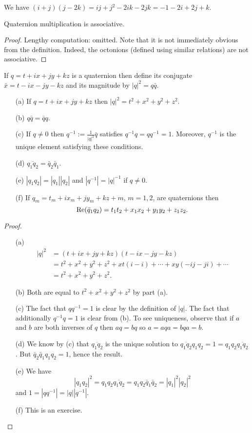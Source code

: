 \documentclass[12pt]{article}
\begin{document}
\begin{exm}
We have $(i+j)(j-2k)=ij+j^2-2ik-2jk=-1-2i+2j+k$.
\end{exm}

\begin{lma}
Quaternion multiplication is associative.
\end{lma}
\begin{proof}
Lengthy computation: omitted. Note that it is not immediately obvious from the definition. Indeed, the octonions (defined using similar relations) are not associative.
\end{proof}

\begin{dfn}
If $q=t+ix+jy+kz$ is a quaternion then define its conjugate $\bar{x}=t-ix-jy-kz$ and its magnitude by $|q|^2=q\bar{q}$.
\end{dfn}

\begin{lma}
  \begin{enumerate}
  \item[(a)] If $q=t+ix+jy+kz$ then $|q|^2=t^2+x^2+y^2+z^2$.
  \item[(b)] $q\bar{q}=\bar{q}q$.
  \item[(c)] If $q\neq 0$ then $q^{-1}:=\frac{1}{|q|^2}\bar{q}$ satisfies $q^{-1}q=qq^{-1}=1$. Moreover, $q^{-1}$ is the unique element satisfying these conditions.
  \item[(d)] $\overline{q_1q_2}=\bar{q}_2\bar{q}_1$.
  \item[(e)] $|q_1q_2|=|q_1||q_2|$ and $|q^{-1}|=|q|^{-1}$ if $q\neq 0$.
  \item[(f)] If $q_m=t_m+ix_m+jy_m+kz+m$, $m=1,2$, are quaternions then
    \[\operatorname{Re}(\bar{q}_1q_2)=t_1t_2+x_1x_2+y_1y_2+z_1z_2.\]
  \end{enumerate}
\end{lma}
\begin{proof}
  \begin{enumerate}
    \item[(a)] \begin{align*}
  |q|^2&=(t+ix+jy+kz)(t-ix-jy-kz)\\
  &=t^2+x^2+y^2+z^2+xt(i-i)+\cdots+xy(-ij-ji)+\cdots\\
  &=t^2+x^2+y^2+z^2.
    \end{align*}
    \item[(b)] Both are equal to $t^2+x^2+y^2+z^2$ by part (a).
    \item[(c)] The fact that $qq^{-1}=1$ is clear by the definition of $|q|$. The fact that additionally $q^{-1}q=1$ is clear from (b). To see uniqueness, observe that if $a$ and $b$ are both inverses of $q$ then $aq=bq$ so $a=aqa=bqa=b$.
    \item[(d)] We know by (c) that $\overline{q_1q_2}$ is the unique solution to $\overline{q_1q_2}q_1q_2=1=q_1q_2\overline{q_1q_2}$. But $\bar{q}_2\bar{q}_1q_1q_2=1$, hence the result.
    \item[(e)] We have
      \[|q_1q_2|^2=q_1q_2\overline{q_1q_2}=q_1q_2\bar{q}_1\bar{q}_2=|q_1|^2|q_2|^2\]
      and $1=|qq^{-1}|=|q||q^{-1}|$.
    \item[(f)] This is an exercise.
  \end{enumerate}
\end{proof}
\end{document}
